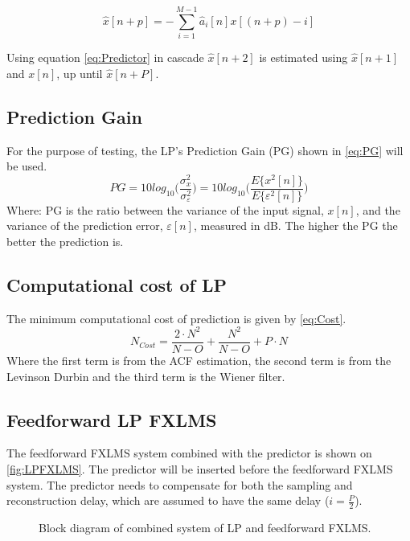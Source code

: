 \begin{equation}\label{eq:Predictor}
\hat{x}[n+p] =- \sum^{M-1}_{i=1}\hat{a}_i[n]x[(n+p)-i]
\end{equation}

Using equation \ref{eq:Predictor} in cascade $\hat{x}[n+2]$ is estimated using $\hat{x}[n+1]$ and $x[n]$, up until $\hat{x}[n+P]$. 


\subsection{Prediction Gain}
For the purpose of testing, the LP's Prediction Gain (PG) shown in \autoref{eq:PG} will be used. 
\begin{equation}\label{eq:PG}
PG = 10 log_{10}\bigg(\frac{\sigma^2_x}{\sigma^2_\varepsilon}\bigg) = 10 log_{10}\bigg(\frac{E\{x^2[n]\}}{E\{\varepsilon^2[n]\}}\bigg)
\end{equation}
Where: PG is the ratio between the variance of the input signal, $x[n]$, and the variance of the prediction error, $\varepsilon[n]$, measured in dB. The higher the PG the better the prediction is.

\subsection{Computational cost of LP}
The minimum computational cost of prediction is given by \autoref{eq:Cost}.
\begin{equation}\label{eq:Cost}
N_{Cost} = \frac{2\cdot N^2}{N-O}+\frac{N^2}{N-O}+P\cdot N   
\end{equation}
Where the first term is from the ACF estimation, the second term is from the Levinson Durbin and the third term is the Wiener filter. 

\subsection{Feedforward LP FXLMS}
The feedforward FXLMS system combined with the predictor is shown on \autoref{fig:LPFXLMS}. The predictor will be inserted before the feedforward FXLMS system. The predictor needs to compensate for both the sampling and reconstruction delay, which are assumed to have the same delay ($i=\frac{P}{2}$).   

\begin{figure}[H]
	\centering
	
	\caption{Block diagram of combined system of LP and feedforward FXLMS.}
	\label{fig:LPFXLMS}
\end{figure}

